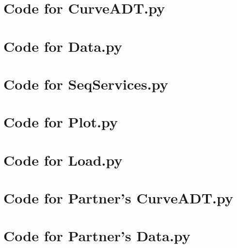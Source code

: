 \documentclass[12pt]{article}
\begin{document}
\newpage

\lstset{language=Python, basicstyle=\tiny, breaklines=true, showspaces=false,
  showstringspaces=false, breakatwhitespace=true}

\def\thesection{\Alph{section}}

\section{Code for CurveADT.py}

\noindent 

\newpage

\section{Code for Data.py}

\noindent 

\newpage

\section{Code for SeqServices.py}

\noindent 

\newpage

\section{Code for Plot.py}

\noindent 

\newpage

\section{Code for Load.py}

\noindent 

\newpage

\section{Code for Partner's CurveADT.py}


\newpage

\section{Code for Partner's Data.py}
\end{document}
